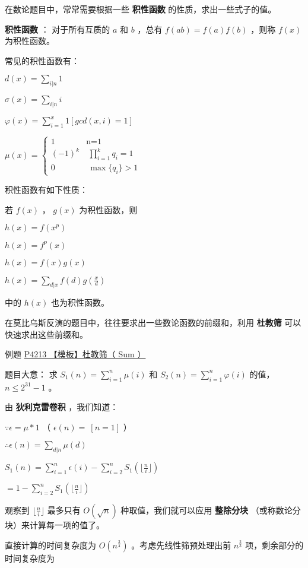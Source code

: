
在数论题目中，常常需要根据一些 \textbf{ 积性函数 } 的性质，求出一些式子的值。

\textbf{ 积性函数 } ： 对于所有互质的 $a$ 和 $b$ ，总有 $f(ab)=f(a)f(b)$ ，则称 $f(x)$ 为积性函数。

常见的积性函数有：

$d(x)=\sum_{i|n} 1$

$\sigma(x)=\sum_{i|n} i$

$\varphi(x)=\sum_{i=1}^x 1[gcd(x,i)=1]$

$\mu(x)=\begin{cases}1&\text{n=1}\\(-1)^k& \ \prod_{i=1}^k q_i=1\\0 &\ \max\{q_i\}>1\end{cases}$

积性函数有如下性质：

若 $f(x)$ ， $g(x)$ 为积性函数，则

$h(x)=f(x^p)$ 

$h(x)=f^p(x)$

$h(x)=f(x)g(x)$

$h(x)=\sum_{d|x} f(d)g(\frac x d)$

中的 $h(x)$ 也为积性函数。

在莫比乌斯反演的题目中，往往要求出一些数论函数的前缀和，利用 \textbf{ 杜教筛 } 可以快速求出这些前缀和。 

\begin{NOTE}{例题 \href{https://www.luogu.org/problemnew/show/P4213}{P4213 【模板】杜教筛（ Sum ） }}{}

\end{NOTE}


题目大意： 求 $S_1(n)= \sum_{i=1}^n \mu(i)$ 和 $S_2(n)= \sum_{i=1}^n \varphi(i)$  的值， $n\le 2^{31} -1$ 。

由 \textbf{ 狄利克雷卷积 } ，我们知道：

$\because \epsilon =\mu * 1$ （ $\epsilon(n)=~[n=1]$ ） 

$\therefore \epsilon (n)=\sum_{d|n} \mu(d)$ 

$S_1(n)=\sum_{i=1}^n \epsilon (i)-\sum_{i=2}^n S_1(\lfloor \frac n i \rfloor)$

$= 1-\sum_{i=2}^n S_1(\lfloor \frac n i \rfloor)$

观察到 $\lfloor \frac n i \rfloor$ 最多只有 $O(\sqrt n)$ 种取值，我们就可以应用 \textbf{ 整除分块 } （或称数论分块）来计算每一项的值了。 

直接计算的时间复杂度为 $O(n^{\frac 3 4})$ 。考虑先线性筛预处理出前 $n^{\frac 2 3}$ 项，剩余部分的时间复杂度为

